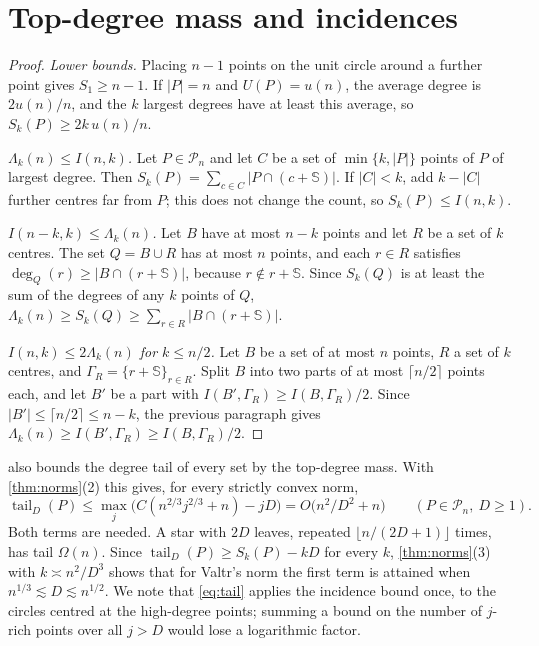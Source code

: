 \documentclass[anonymous,a4paper,USenglish,cleveref,autoref,thm-restate]{socg-lipics-v2021}
\newcommand{\cP}{\mathcal{P}}
\newcommand{\Lam}{\Lambda}
\newcommand{\tail}{\operatorname{tail}}
\begin{document}
\section{Top-degree mass and incidences}
\label{sec:mass}

\incidences*

\begin{proof}
\emph{Lower bounds.} Placing $n-1$ points on the unit circle around a further point gives $S_1\ge n-1$. If $|P|=n$ and $U(P)=u(n)$, the average degree is $2u(n)/n$, and the $k$ largest degrees have at least this average, so $S_k(P)\ge 2k\,u(n)/n$.

\emph{$\Lam_k(n)\le I(n,k)$.} Let $P\in\cP_n$ and let $C$ be a set of $\min\{k,|P|\}$ points of $P$ of largest degree. Then $S_k(P)=\sum_{c\in C}|P\cap(c+\mathbb S)|$. If $|C|<k$, add $k-|C|$ further centres far from $P$; this does not change the count, so $S_k(P)\le I(n,k)$.

\emph{$I(n-k,k)\le\Lam_k(n)$.} Let $B$ have at most $n-k$ points and let $R$ be a set of $k$ centres. The set $Q=B\cup R$ has at most $n$ points, and each $r\in R$ satisfies $\deg_Q(r)\ge|B\cap(r+\mathbb S)|$, because $r\notin r+\mathbb S$. Since $S_k(Q)$ is at least the sum of the degrees of any $k$ points of $Q$, $\Lam_k(n)\ge S_k(Q)\ge\sum_{r\in R}|B\cap(r+\mathbb S)|$.

\emph{$I(n,k)\le2\Lam_k(n)$ for $k\le n/2$.} Let $B$ be a set of at most $n$ points, $R$ a set of $k$ centres, and $\Gamma_R=\{r+\mathbb S\}_{r\in R}$. Split $B$ into two parts of at most $\lceil n/2\rceil$ points each, and let $B'$ be a part with $I(B',\Gamma_R)\ge I(B,\Gamma_R)/2$. Since $|B'|\le\lceil n/2\rceil\le n-k$, the previous paragraph gives $\Lam_k(n)\ge I(B',\Gamma_R)\ge I(B,\Gamma_R)/2$.
\end{proof}

 also bounds the degree tail of every set by the top-degree mass. With \cref{thm:norms}(2) this gives, for every strictly convex norm,
\begin{equation}
\label{eq:tail}
  \tail_D(P)\le\max_{j}\bigl(C(n^{2/3}j^{2/3}+n)-jD\bigr)=O\bigl(n^2/D^2+n\bigr)\qquad(P\in\cP_n,\ D\ge1).
\end{equation}
Both terms are needed. A star with $2D$ leaves, repeated $\lfloor n/(2D+1)\rfloor$ times, has tail $\Omega(n)$. Since $\tail_D(P)\ge S_k(P)-kD$ for every $k$, \cref{thm:norms}(3) with $k\asymp n^2/D^3$ shows that for Valtr's norm the first term is attained when $n^{1/3}\lesssim D\lesssim n^{1/2}$. We note that \eqref{eq:tail} applies the incidence bound once, to the circles centred at the high-degree points; summing a bound on the number of $j$-rich points over all $j>D$ would lose a logarithmic factor.
\end{document}
